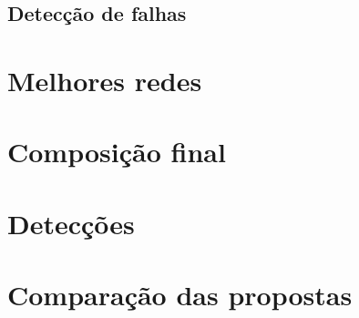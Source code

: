 \subsection{Detecção de falhas}

\section{Melhores redes}

\section{Composição final}

\section{Detecções}

\section{Comparação das propostas}
